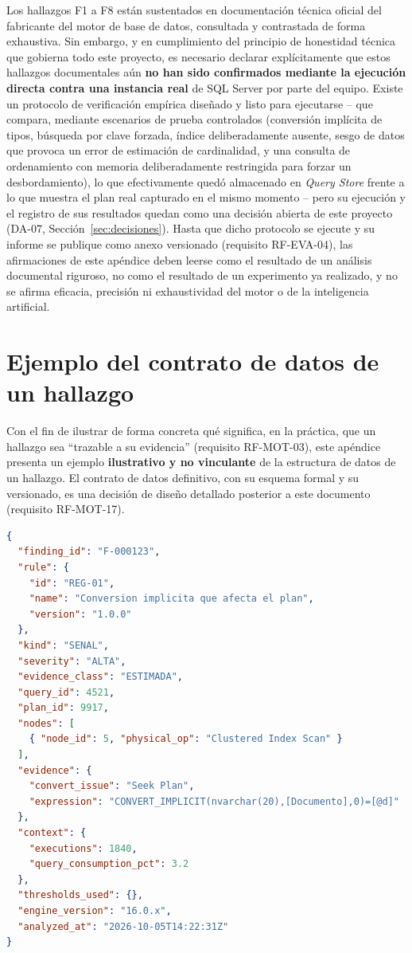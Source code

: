 \documentclass[11pt,a4paper]{report}
\begin{document}
Los hallazgos F1 a F8 est\'an sustentados en documentaci\'on t\'ecnica oficial del fabricante del motor de base de datos, consultada y contrastada de forma exhaustiva. Sin embargo, y en cumplimiento del principio de honestidad t\'ecnica que gobierna todo este proyecto, es necesario declarar expl\'icitamente que estos hallazgos documentales a\'un \textbf{no han sido confirmados mediante la ejecuci\'on directa contra una instancia real} de SQL Server por parte del equipo. Existe un protocolo de verificaci\'on emp\'irica dise\~nado y listo para ejecutarse -- que compara, mediante escenarios de prueba controlados (conversi\'on impl\'icita de tipos, b\'usqueda por clave forzada, \'indice deliberadamente ausente, sesgo de datos que provoca un error de estimaci\'on de cardinalidad, y una consulta de ordenamiento con memoria deliberadamente restringida para forzar un desbordamiento), lo que efectivamente qued\'o almacenado en \textit{Query Store} frente a lo que muestra el plan real capturado en el mismo momento -- pero su ejecuci\'on y el registro de sus resultados quedan como una decisi\'on abierta de este proyecto (DA-07, Secci\'on~\ref{sec:decisiones}). Hasta que dicho protocolo se ejecute y su informe se publique como anexo versionado (requisito RF-EVA-04), las afirmaciones de este ap\'endice deben leerse como el resultado de un an\'alisis documental riguroso, no como el resultado de un experimento ya realizado, y no se afirma eficacia, precisi\'on ni exhaustividad del motor o de la inteligencia artificial.

\chapter{Ejemplo del contrato de datos de un hallazgo}
\label{ap:contrato}

Con el fin de ilustrar de forma concreta qu\'e significa, en la pr\'actica, que un hallazgo sea \textquotedblleft trazable a su evidencia\textquotedblright{} (requisito RF-MOT-03), este ap\'endice presenta un ejemplo \textbf{ilustrativo y no vinculante} de la estructura de datos de un hallazgo. El contrato de datos definitivo, con su esquema formal y su versionado, es una decisi\'on de dise\~no detallado posterior a este documento (requisito RF-MOT-17).

\begin{lstlisting}[language=json,caption={Ejemplo ilustrativo de un hallazgo generado por la regla REG-01},label={lst:hallazgo}]
{
  "finding_id": "F-000123",
  "rule": {
    "id": "REG-01",
    "name": "Conversion implicita que afecta el plan",
    "version": "1.0.0"
  },
  "kind": "SENAL",
  "severity": "ALTA",
  "evidence_class": "ESTIMADA",
  "query_id": 4521,
  "plan_id": 9917,
  "nodes": [
    { "node_id": 5, "physical_op": "Clustered Index Scan" }
  ],
  "evidence": {
    "convert_issue": "Seek Plan",
    "expression": "CONVERT_IMPLICIT(nvarchar(20),[Documento],0)=[@d]"
  },
  "context": {
    "executions": 1840,
    "query_consumption_pct": 3.2
  },
  "thresholds_used": {},
  "engine_version": "16.0.x",
  "analyzed_at": "2026-10-05T14:22:31Z"
}
\end{lstlisting}
\end{document}
